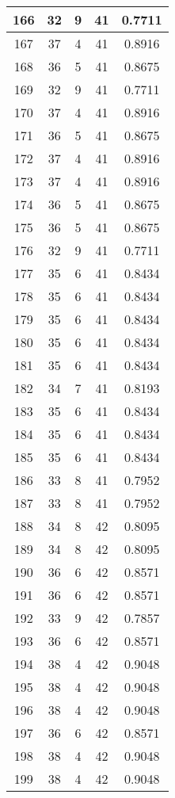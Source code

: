\documentclass[letterpaper, 12pt]{article}
\begin{document}
\begin{longtable}{|c|c|c|c|c|}
\hline
166 & 32 & 9 & 41 & 0.7711 \\
\hline
167 & 37 & 4 & 41 & 0.8916 \\
\hline
168 & 36 & 5 & 41 & 0.8675 \\
\hline
169 & 32 & 9 & 41 & 0.7711 \\
\hline
170 & 37 & 4 & 41 & 0.8916 \\
\hline
171 & 36 & 5 & 41 & 0.8675 \\
\hline
172 & 37 & 4 & 41 & 0.8916 \\
\hline
173 & 37 & 4 & 41 & 0.8916 \\
\hline
174 & 36 & 5 & 41 & 0.8675 \\
\hline
175 & 36 & 5 & 41 & 0.8675 \\
\hline
176 & 32 & 9 & 41 & 0.7711 \\
\hline
177 & 35 & 6 & 41 & 0.8434 \\
\hline
178 & 35 & 6 & 41 & 0.8434 \\
\hline
179 & 35 & 6 & 41 & 0.8434 \\
\hline
180 & 35 & 6 & 41 & 0.8434 \\
\hline
181 & 35 & 6 & 41 & 0.8434 \\
\hline
182 & 34 & 7 & 41 & 0.8193 \\
\hline
183 & 35 & 6 & 41 & 0.8434 \\
\hline
184 & 35 & 6 & 41 & 0.8434 \\
\hline
185 & 35 & 6 & 41 & 0.8434 \\
\hline
186 & 33 & 8 & 41 & 0.7952 \\
\hline
187 & 33 & 8 & 41 & 0.7952 \\
\hline
188 & 34 & 8 & 42 & 0.8095 \\
\hline
189 & 34 & 8 & 42 & 0.8095 \\
\hline
190 & 36 & 6 & 42 & 0.8571 \\
\hline
191 & 36 & 6 & 42 & 0.8571 \\
\hline
192 & 33 & 9 & 42 & 0.7857 \\
\hline
193 & 36 & 6 & 42 & 0.8571 \\
\hline
194 & 38 & 4 & 42 & 0.9048 \\
\hline
195 & 38 & 4 & 42 & 0.9048 \\
\hline
196 & 38 & 4 & 42 & 0.9048 \\
\hline
197 & 36 & 6 & 42 & 0.8571 \\
\hline
198 & 38 & 4 & 42 & 0.9048 \\
\hline
199 & 38 & 4 & 42 & 0.9048 \\
\hline
\end{longtable}
\end{document}
